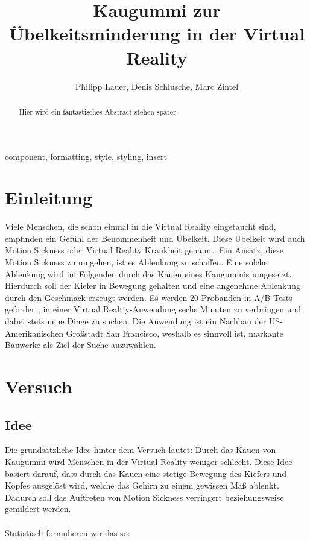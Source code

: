 \documentclass[conference, 12pt]{IEEEtran}
\begin{document}
\title{Kaugummi zur Übelkeitsminderung in der Virtual Reality\\}

\author{Philipp Lauer, Denis Schlusche, Marc Zintel}

\maketitle

\begin{abstract}
Hier wird ein fantastisches Abstract stehen später
\end{abstract}

\begin{IEEEkeywords}
component, formatting, style, styling, insert
\end{IEEEkeywords}

\section{Einleitung}
Viele Menschen, die schon einmal in die Virtual Reality eingetaucht sind, empfinden ein Gefühl der Benommenheit und Übelkeit. Diese Übelkeit wird auch Motion Sickness oder Virtual Reality Krankheit genannt. Ein Ansatz, diese Motion Sickness zu umgehen, ist es Ablenkung zu schaffen. Eine solche Ablenkung wird im Folgenden durch das Kauen eines Kaugummis umgesetzt. Hierdurch soll der Kiefer in Bewegung gehalten und eine angenehme Ablenkung durch den Geschmack erzeugt werden. Es werden 20 Probanden in A/B-Tests gefordert, in einer Virtual Realtiy-Anwendung sechs Minuten zu verbringen und dabei stets neue Dinge zu suchen. Die Anwendung ist ein Nachbau der US-Amerikanischen Großstadt San Francisco, weshalb es sinnvoll ist, markante Bauwerke als Ziel der Suche auzuwählen. 

\section{Versuch}
\subsection{Idee}
Die grundsätzliche Idee hinter dem Versuch lautet: Durch das Kauen von Kaugummi wird Menschen in der Virtual Reality weniger schlecht.
Diese Idee basiert darauf, dass durch das Kauen eine stetige Bewegung des Kiefers und Kopfes ausgelöst wird, welche das Gehirn zu einem gewissen Maß ablenkt. Dadurch soll das Auftreten von Motion Sickness verringert beziehungsweise gemildert werden. 
\\
\\
Statistisch formulieren wir das so:
\end{document}

